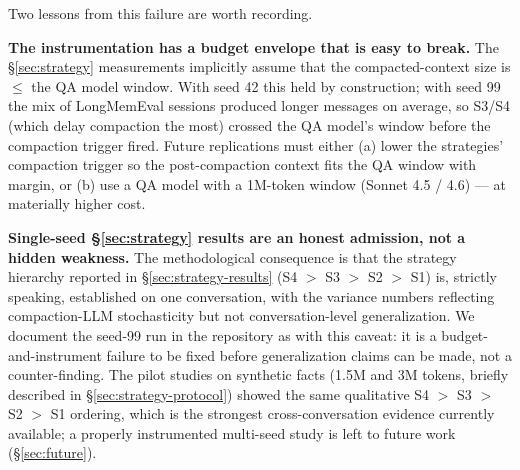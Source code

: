Two lessons from this failure are worth recording.

\textbf{The instrumentation has a budget envelope that is easy to break.}
The \S\ref{sec:strategy} measurements implicitly assume that the compacted-context size is $\leq$ the QA
model window. With seed 42 this held by construction; with seed 99 the
mix of LongMemEval sessions produced longer messages on average, so
S3/S4 (which delay compaction the most) crossed the QA model's window
before the compaction trigger fired. Future replications must either
(a) lower the strategies' compaction trigger so the post-compaction
context fits the QA window with margin, or (b) use a QA model with a
1M-token window (Sonnet 4.5 / 4.6) --- at materially higher cost.

\textbf{Single-seed \S\ref{sec:strategy} results are an honest admission, not a hidden weakness.}
The methodological consequence is that the strategy hierarchy reported
in \S\ref{sec:strategy-results} (S4 $>$ S3 $>$ S2 $>$ S1) is, strictly speaking, established on one
conversation, with the variance numbers reflecting compaction-LLM
stochasticity but not conversation-level generalization. We document
the seed-99 run in the repository as 
with this caveat: it is a budget-and-instrument failure to be fixed
before generalization claims can be made, not a counter-finding. The
pilot studies on synthetic facts (1.5M and 3M tokens, briefly
described in \S\ref{sec:strategy-protocol}) showed the same qualitative S4 $>$ S3 $>$ S2 $>$ S1
ordering, which is the strongest cross-conversation evidence currently
available; a properly instrumented multi-seed study is left to future
work (\S\ref{sec:future}).
